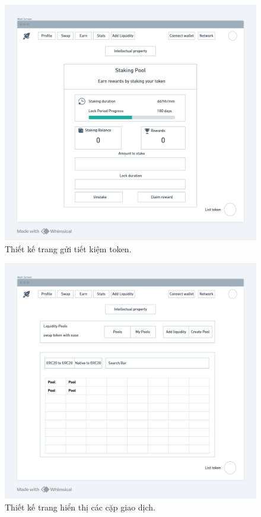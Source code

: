 \begin{figure}[H]
    \centering
    \includegraphics[width=1\textwidth]{figures/c2/Stake.png}
    \caption{Thiết kế trang gửi tiết kiệm token.}
    \label{fig:architecture-diagram}
\end{figure}

\begin{figure}[H]
    \centering
    \includegraphics[width=1\textwidth]{figures/c2/Swap.png}
    \caption{Thiết kế trang hiển thị các cặp giao dịch.}
    \label{fig:architecture-diagram}
\end{figure}

